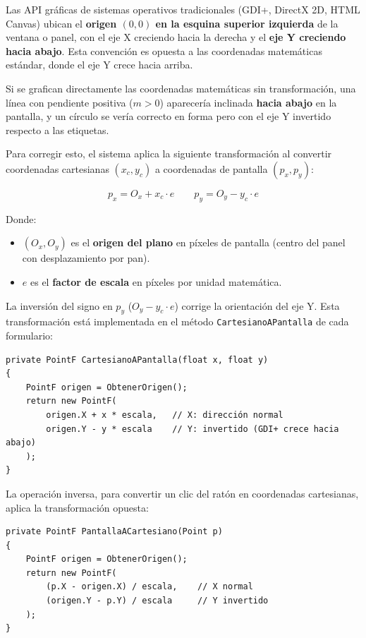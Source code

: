 \documentclass[
  spanish,
  a4paper,
  12pt,
]{article}
\newcommand{\passthrough}[1]{#1}
\providecommand{\tightlist}{%
  \setlength{\itemsep}{0pt}\setlength{\parskip}{0pt}}
\begin{document}
Las API gráficas de sistemas operativos tradicionales (GDI+, DirectX 2D,
HTML Canvas) ubican el \textbf{origen \((0, 0)\) en la esquina superior
izquierda} de la ventana o panel, con el eje X creciendo hacia la
derecha y el \textbf{eje Y creciendo hacia abajo}. Esta convención es
opuesta a las coordenadas matemáticas estándar, donde el eje Y crece
hacia arriba.

Si se grafican directamente las coordenadas matemáticas sin
transformación, una línea con pendiente positiva (\(m > 0\)) aparecería
inclinada \textbf{hacia abajo} en la pantalla, y un círculo se vería
correcto en forma pero con el eje Y invertido respecto a las etiquetas.

Para corregir esto, el sistema aplica la siguiente transformación al
convertir coordenadas cartesianas \((x_c, y_c)\) a coordenadas de
pantalla \((p_x, p_y)\):

\[p_x = O_x + x_c \cdot e \qquad p_y = O_y - y_c \cdot e\]

Donde:

\begin{itemize}
\tightlist
\item \((O_x, O_y)\) es el \textbf{origen del plano} en píxeles de pantalla (centro del panel con desplazamiento por pan).
\item \(e\) es el \textbf{factor de escala} en píxeles por unidad matemática.
\end{itemize}

La inversión del signo en \(p_y\) (\(O_y - y_c \cdot e\)) corrige la
orientación del eje Y. Esta transformación está implementada en el
método \passthrough{\lstinline!CartesianoAPantalla!} de cada formulario:

\begin{lstlisting}
private PointF CartesianoAPantalla(float x, float y)
{
    PointF origen = ObtenerOrigen();
    return new PointF(
        origen.X + x * escala,   // X: dirección normal
        origen.Y - y * escala    // Y: invertido (GDI+ crece hacia abajo)
    );
}
\end{lstlisting}

La operación inversa, para convertir un clic del ratón en coordenadas
cartesianas, aplica la transformación opuesta:

\begin{lstlisting}
private PointF PantallaACartesiano(Point p)
{
    PointF origen = ObtenerOrigen();
    return new PointF(
        (p.X - origen.X) / escala,    // X normal
        (origen.Y - p.Y) / escala     // Y invertido
    );
}
\end{lstlisting}
\end{document}

